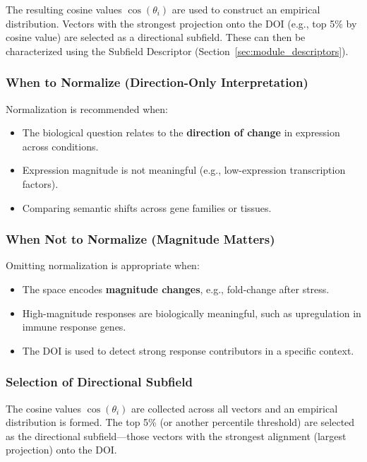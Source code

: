         The resulting cosine values \( \cos(\theta_i) \) are used to construct an empirical distribution. Vectors with the strongest projection onto the DOI (e.g., top 5\% by cosine value) are selected as a directional subfield. These can then be characterized using the Subfield Descriptor (Section~\ref{sec:module_descriptors}).

        \subsubsection{When to Normalize (Direction-Only Interpretation)}

            Normalization is recommended when:
            \begin{itemize}
                \item The biological question relates to the \textbf{direction of change} in expression across conditions.
                \item Expression magnitude is not meaningful (e.g., low-expression transcription factors).
                \item Comparing semantic shifts across gene families or tissues.
            \end{itemize}

        \subsubsection{When Not to Normalize (Magnitude Matters)}

            Omitting normalization is appropriate when:
            \begin{itemize}
                \item The space encodes \textbf{magnitude changes}, e.g., fold-change after stress.
                \item High-magnitude responses are biologically meaningful, such as upregulation in immune response genes.
                \item The DOI is used to detect strong response contributors in a specific context.
            \end{itemize}

        \subsubsection{Selection of Directional Subfield}

            The cosine values \( \cos(\theta_i) \) are collected across all vectors and an empirical distribution is formed. The top 5\% (or another percentile threshold) are selected as the directional subfield—those vectors with the strongest alignment (largest projection) onto the DOI.

